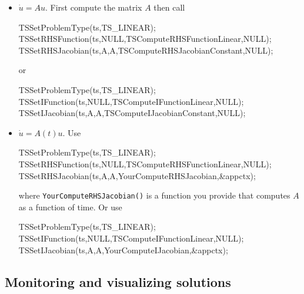 \begin{itemize}
\item $ \dot{u} = A u.$ First compute the matrix $ A$ then call
\begin{tabbing}
  TSSetProblemType(ts,TS\_LINEAR);\\
  TSSetRHSFunction(ts,NULL,TSComputeRHSFunctionLinear,NULL); \\
  TSSetRHSJacobian(ts,A,A,TSComputeRHSJacobianConstant,NULL);
\end{tabbing}
or
\begin{tabbing}
  TSSetProblemType(ts,TS\_LINEAR);\\
  TSSetIFunction(ts,NULL,TSComputeIFunctionLinear,NULL); \\
  TSSetIJacobian(ts,A,A,TSComputeIJacobianConstant,NULL);
\end{tabbing}


\item $ \dot{u} = A(t) u.$ Use
\begin{tabbing}
  TSSetProblemType(ts,TS\_LINEAR);\\
  TSSetRHSFunction(ts,NULL,TSComputeRHSFunctionLinear,NULL); \\
  TSSetRHSJacobian(ts,A,A,YourComputeRHSJacobian,\&appctx);
\end{tabbing}
where {\tt YourComputeRHSJacobian()} is a function you provide that computes $A$ as a function of time. Or use
\begin{tabbing}
  TSSetProblemType(ts,TS\_LINEAR);\\
  TSSetIFunction(ts,NULL,TSComputeIFunctionLinear,NULL); \\
  TSSetIJacobian(ts,A,A,YourComputeIJacobian,\&appctx);
\end{tabbing}

\end{itemize}

\subsection{Monitoring and visualizing solutions}

